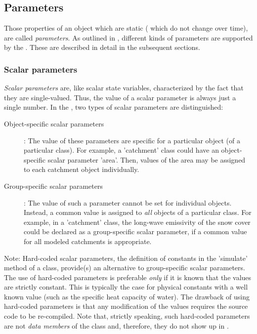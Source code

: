 \subsection{Parameters} \label{sec:concept-classFeatures-params}

Those properties of an object which are static (\ie{} which do not change over time), are called \emph{parameters}. As outlined in , different kinds of parameters are supported by the . These are described in detail in the subsequent sections.

\subsubsection*{Scalar parameters} \label{sec:concept-classFeatures-paramsNum}

\emph{Scalar parameters} are, like scalar state variables, characterized by the fact that they are single-valued. Thus, the value of a scalar parameter is always just a single number. In the , two types of scalar parameters are distinguished:
\begin{description}
  \item [Object-specific scalar parameters]: The value of these parameters are specific for a particular object (of a particular class). For example, a 'catchment' class could have an object-specific scalar parameter 'area'. Then, values of the area may be assigned to each catchment object individually.
  \item [Group-specific scalar parameters]: The value of such a parameter cannot be set for individual objects. Instead, a common value is assigned to \emph{all} objects of a particular class. For example, in a 'catchment' class, the long-wave emissivity of the snow cover could be declared as a group-specific scalar parameter, if a common value for all modeled catchments is appropriate.
\end{description}

Note: Hard-coded scalar parameters, \ie{} the definition of constants in the 'simulate' method of a class, provide(s) an alternative to group-specific scalar parameters. The use of hard-coded parameters is preferable \emph{only} if it is known that the values are strictly constant. This is typically the case for physical constants with a well known value (such as the specific heat capacity of water). The drawback of using hard-coded parameters is that any modification of the values requires the source code to be re-compiled. Note that, strictly speaking, such hard-coded parameters are not \emph{data members} of the class and, therefore, they do not show up in .

